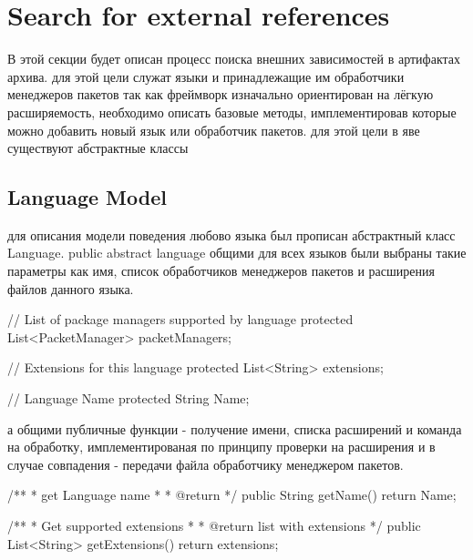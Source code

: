 \fi
\section{Search for external references}
В этой секции будет описан процесс поиска внешних зависимостей в артифактах архива.
для этой цели служат языки и принадлежащие им обработчики менеджеров пакетов
так как фреймворк изначально ориентирован на лёгкую расширяемость, необходимо описать базовые методы, имплементировав которые можно добавить новый язык или обработчик пакетов.
для этой цели в яве существуют абстрактные классы
\fi
\subsection*{Language Model}
для описания модели поведения любово языка был прописан абстрактный класс Language. public abstract language
общими для всех языков были выбраны такие параметры как имя, список обработчиков менеджеров пакетов и расширения файлов данного языка. 

// List of package managers supported by language
protected List<PacketManager> packetManagers;

// Extensions for this language
protected List<String> extensions;

// Language Name
protected String Name;

а общими публичные функции - получение имени, списка расширений и команда на обработку, имплементированая по принципу проверки на расширения и в случае совпадения - передачи файла обработчику менеджером пакетов.

/**
* get Language name
* 
* @return
*/
public String getName() {
	return Name;
}

/**
* Get supported extensions
* 
* @return list with extensions
*/
public List<String> getExtensions() {
	return extensions;
}

